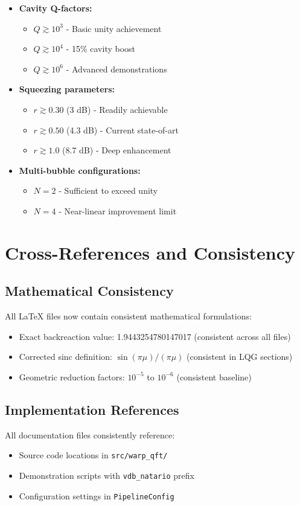 \documentclass[11pt]{article}
\begin{document}
\begin{itemize}
\item \textbf{Cavity Q-factors:}
  \begin{itemize}
    \item $Q \gtrsim 10^3$ - Basic unity achievement
    \item $Q \gtrsim 10^4$ - 15\% cavity boost
    \item $Q \gtrsim 10^6$ - Advanced demonstrations
  \end{itemize}
\item \textbf{Squeezing parameters:}
  \begin{itemize}
    \item $r \gtrsim 0.30$ (3 dB) - Readily achievable
    \item $r \gtrsim 0.50$ (4.3 dB) - Current state-of-art
    \item $r \gtrsim 1.0$ (8.7 dB) - Deep enhancement
  \end{itemize}
\item \textbf{Multi-bubble configurations:}
  \begin{itemize}
    \item $N = 2$ - Sufficient to exceed unity
    \item $N = 4$ - Near-linear improvement limit
  \end{itemize}
\end{itemize}

\section{Cross-References and Consistency}

\subsection{Mathematical Consistency}
All LaTeX files now contain consistent mathematical formulations:
\begin{itemize}
\item Exact backreaction value: 1.9443254780147017 (consistent across all files)
\item Corrected sinc definition: $\sin(\pi\mu)/(\pi\mu)$ (consistent in LQG sections)
\item Geometric reduction factors: $10^{-5}$ to $10^{-6}$ (consistent baseline)
\end{itemize}

\subsection{Implementation References}
All documentation files consistently reference:
\begin{itemize}
\item Source code locations in \texttt{src/warp\_qft/}
\item Demonstration scripts with \texttt{vdb\_natario} prefix
\item Configuration settings in \texttt{PipelineConfig}
\end{itemize}
\end{document}
